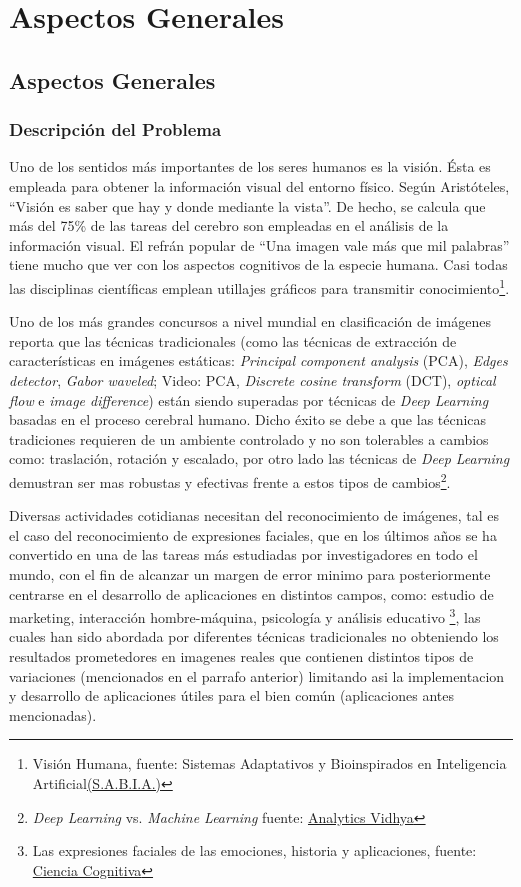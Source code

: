 \chapter{Aspectos Generales}
\section{Aspectos Generales}
\subsection{Descripción del Problema}
Uno de los sentidos más importantes de los seres humanos es la visión. Ésta es empleada para obtener la información visual del entorno físico. Según Aristóteles, “Visión es saber que hay y donde mediante la vista”. De hecho, se calcula que más del 75\% de las tareas del cerebro son empleadas en el análisis de la información visual. El refrán popular de “Una imagen vale más que mil palabras” tiene mucho que ver con los aspectos cognitivos de la especie humana. Casi todas las disciplinas científicas emplean utillajes gráficos para transmitir conocimiento\footnote[1]{Visión Humana, fuente: Sistemas Adaptativos y Bioinspirados en Inteligencia Artificial\href{http://sabia.tic.udc.es/}{(S.A.B.I.A.)}}.

Uno de los más grandes concursos a nivel mundial en clasificación de imágenes reporta que las técnicas tradicionales (como las técnicas de extracción de características en imágenes estáticas: \textit{Principal component analysis} (PCA), \textit{Edges detector}, \textit{Gabor waveled}; Video: PCA, \textit{Discrete cosine transform} (DCT), \textit{optical flow} e \textit{image difference}) están siendo superadas por técnicas de \textit{Deep Learning} basadas en el proceso cerebral humano. Dicho éxito se debe a que las técnicas tradiciones requieren de un ambiente controlado y no son tolerables a cambios como: traslación, rotación y escalado, por otro lado las técnicas de \textit{Deep Learning} demustran ser mas robustas y efectivas frente a estos tipos de cambios\footnote[2]{\textit{Deep Learning} vs. \textit{Machine Learning} fuente: \href{http://www.image-net.org/}{Analytics Vidhya}}.
	
Diversas actividades cotidianas necesitan del reconocimiento de imágenes, tal es el caso del reconocimiento de expresiones faciales, que en los últimos años se ha convertido en una de las tareas más estudiadas por investigadores en todo el mundo, con el fin de alcanzar un margen de error minimo para posteriormente centrarse en el desarrollo de aplicaciones en distintos campos, como: estudio de marketing, interacción hombre-máquina, psicología y análisis educativo \footnote[3]{Las expresiones faciales de las emociones, historia y aplicaciones, fuente: \href{http://medina-psicologia.ugr.es/cienciacognitiva/?p=664}{Ciencia Cognitiva}}, las cuales han sido abordada por diferentes técnicas tradicionales no obteniendo los resultados prometedores en imagenes reales que contienen distintos tipos de variaciones (mencionados en el parrafo anterior) limitando asi la implementacion y desarrollo de aplicaciones útiles para el bien común (aplicaciones antes mencionadas).

